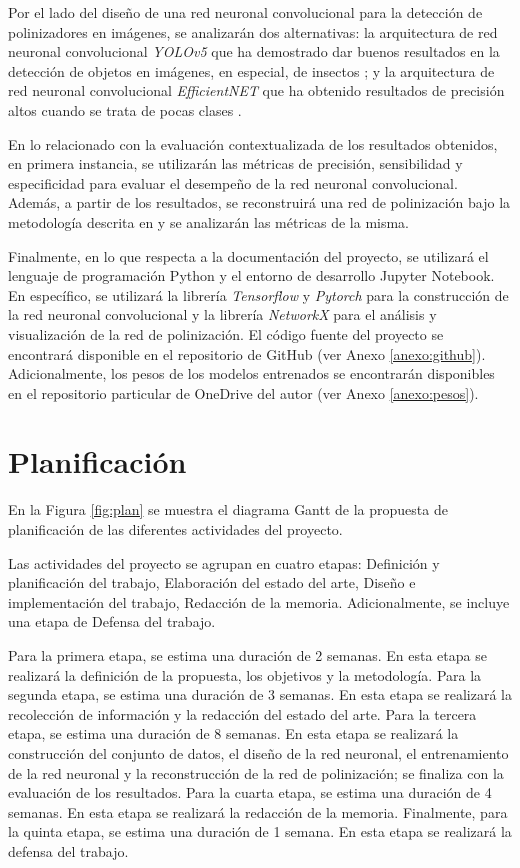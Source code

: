 Por el lado del diseño de una red neuronal convolucional para la detección de polinizadores en imágenes, se analizarán dos alternativas: la arquitectura de red neuronal convolucional \textit{YOLOv5}  que ha demostrado dar buenos resultados en la detección de objetos en imágenes, en especial, de insectos \cite{ahmad-2022,qi-2023}; y la arquitectura de red neuronal convolucional \textit{EfficientNET} que ha obtenido resultados de precisión altos cuando se trata de pocas clases \cite{monis-2022}.

En lo relacionado con la evaluación contextualizada de los resultados obtenidos, en primera instancia, se utilizarán las métricas de precisión, sensibilidad y especificidad para evaluar el desempeño de la red neuronal convolucional. Además, a partir de los resultados, se reconstruirá una red de polinización bajo la metodología descrita en \cite{young-2021} y se analizarán las métricas de la misma.

Finalmente, en lo que respecta a la documentación del proyecto, se utilizará el lenguaje de programación Python y el entorno de desarrollo Jupyter Notebook. En específico, se utilizará la librería \textit{Tensorflow} y \textit{Pytorch} para la construcción de la red neuronal convolucional y la librería \textit{NetworkX} para el análisis y visualización de la red de polinización. El código fuente del proyecto se encontrará disponible en el repositorio de GitHub (ver Anexo \ref{anexo:github}). Adicionalmente, los pesos de los modelos entrenados se encontrarán disponibles en el repositorio particular de OneDrive del autor (ver Anexo \ref{anexo:pesos}).

\section{Planificación}

En la Figura \ref{fig:plan} se muestra el diagrama Gantt de la propuesta de planificación de las diferentes actividades del proyecto.

Las actividades del proyecto se agrupan en cuatro etapas: Definición y planificación del trabajo, Elaboración del estado del arte, Diseño e implementación del trabajo, Redacción de la memoria. Adicionalmente, se incluye una etapa de Defensa del trabajo.

Para la primera etapa, se estima una duración de 2 semanas. En esta etapa se realizará la definición de la propuesta, los objetivos y la metodología. Para la segunda etapa, se estima una duración de 3 semanas. En esta etapa se realizará la recolección de información y la redacción del estado del arte. Para la tercera etapa, se estima una duración de 8 semanas. En esta etapa se realizará la construcción del conjunto de datos, el diseño de la red neuronal, el entrenamiento de la red neuronal y la reconstrucción de la red de polinización; se finaliza con la evaluación de los resultados. Para la cuarta etapa, se estima una duración de 4 semanas. En esta etapa se realizará la redacción de la memoria. Finalmente, para la quinta etapa, se estima una duración de 1 semana. En esta etapa se realizará la defensa del trabajo.

